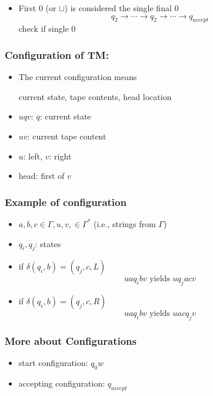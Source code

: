 \begin{frame}[allowframebreaks]
\begin{itemize}
\item First 0 (or $\sqcup$) is considered the single
final 0 
\begin{equation*}
q_2 \rightarrow \cdots
\rightarrow q_2 \rightarrow \cdots \rightarrow
q_{accept}
\end{equation*}
check if single 0



\end{itemize}\end{frame}





\begin{frame}[allowframebreaks] \frametitle{Configuration of TM:}
  \begin{itemize}
  \item The current configuration means
    \begin{center}
    current state, tape contents, head location
\end{center}
\item $uqv$: $q$: current state

\item [] $uv$: current tape content

\item [] $u$: left, $v$: right

\item [] head: first of $v$

\end{itemize}\end{frame} \begin{frame}[allowframebreaks] \frametitle{Example of configuration}
  \begin{itemize}
\item $a,b,c \in \Gamma, u,v, \in \Gamma^*$ (i.e., strings from
$\Gamma$)

\item [] $q_i, q_j$: states

\item if $\delta(q_i,b) =(q_j, c, L)$
  \begin{equation*}
uaq_i bv \mbox{ yields } uq_j a cv
  \end{equation*}
\item if $\delta(q_i,b) = (q_j, c, R)$
  \begin{equation*}
    uaq_i bv \mbox{ yields } uacq_j v
  \end{equation*}
\end{itemize}\end{frame} \begin{frame}[allowframebreaks] \frametitle{More about Configurations}
  \begin{itemize}
\item start configuration: $q_0 w$
\item accepting configuration: $q_{accept}$


\end{itemize}
\end{frame}
